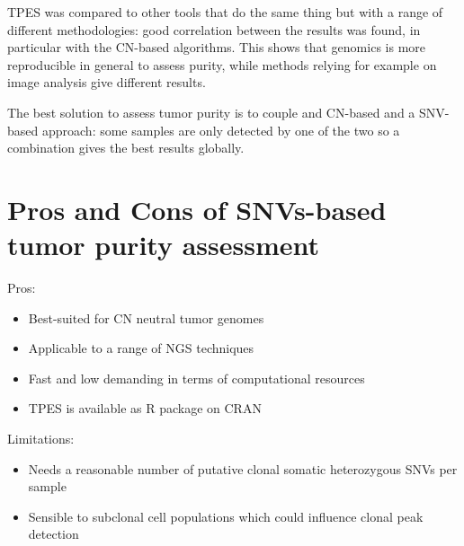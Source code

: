 TPES was compared to other tools that do the same thing but with a range of different methodologies: good correlation between the results was found, in particular with the CN-based algorithms. This shows that genomics is more reproducible in general to assess purity, while methods relying for example on image analysis give different results.

The best solution to assess tumor purity is to couple and CN-based and a SNV-based approach: some samples are only detected by one of the two so a combination gives the best results globally.

\section{Pros and Cons of SNVs-based tumor purity assessment}
Pros:
\begin{itemize}
    \item Best-suited for CN neutral tumor genomes
    \item Applicable to a range of NGS techniques
    \item Fast and low demanding in terms of computational resources
    \item TPES is available as R package on CRAN
\end{itemize}
Limitations:
\begin{itemize}
    \item Needs a reasonable number of putative clonal somatic heterozygous SNVs per sample
    \item  Sensible to subclonal cell populations which could influence clonal peak detection
\end{itemize}
